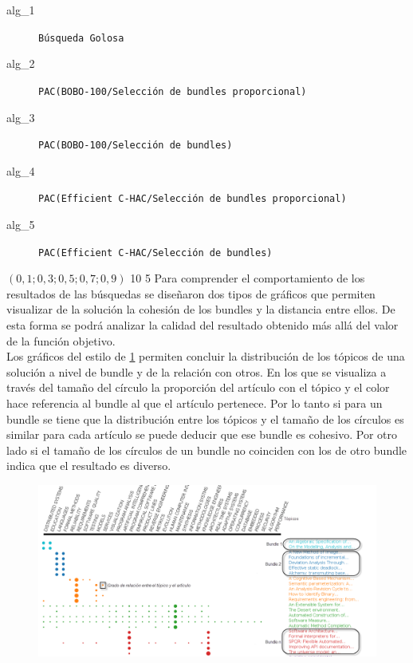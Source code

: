 \Solucion
{}
{
\begin{description}
	\item[alg\_1] \texttt{Búsqueda Golosa}
	\item[alg\_2] \texttt{PAC(BOBO-100/Selección de bundles proporcional)}
	\item[alg\_3] \texttt{PAC(BOBO-100/Selección de bundles)}
	\item[alg\_4] \texttt{PAC(Efficient C-HAC/Selección de bundles proporcional)}
	\item[alg\_5] \texttt{PAC(Efficient C-HAC/Selección de bundles)}
\end{description}
}
{$(0,1; 0,3; 0,5; 0,7; 0,9)$}
{10}
{5}
Para comprender el comportamiento de los resultados de las búsquedas se diseñaron dos tipos de gráficos que permiten visualizar de la solución la cohesión de los bundles y la distancia entre ellos. De esta forma se podrá analizar la calidad del resultado obtenido más allá del valor de la función objetivo.\\
Los gráficos del estilo de \ref{res:img-explain-bars} permiten concluir la distribución de los tópicos de una solución a nivel de bundle y de la relación con otros. En los que se visualiza a través del tamaño del círculo la proporción del artículo con el tópico y el color hace referencia al bundle al que el artículo pertenece. Por lo tanto si para un bundle se tiene que la distribución entre los tópicos y el tamaño de los círculos es similar para cada artículo se puede deducir que ese bundle es cohesivo. Por otro lado si el tamaño de los círculos de un bundle no coinciden con los de otro bundle indica que el resultado es diverso.
\begin{figure}[H]
  \centering
    \includegraphics[width=1\textwidth]{img/explain-bars.png}
  \caption{}
  \label{res:img-explain-bars}
\end{figure}

